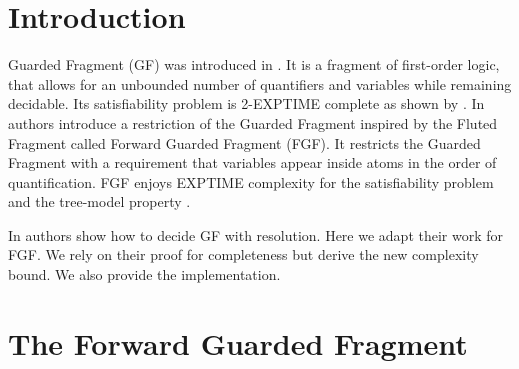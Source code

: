 \documentclass[english, shortabstract]{iithesis}
\author         {Karol Ochman-Milarski}
\theoremstyle{definition} \newtheorem{definition}{Definition}[chapter]
\theoremstyle{remark} \newtheorem{remark}[definition]{Observation}
\theoremstyle{plain} \newtheorem{theorem}[definition]{Theorem}
\theoremstyle{plain} \newtheorem{lemma}[definition]{Lemma}
\begin{document}

\chapter{Introduction}

Guarded Fragment (GF) was introduced in \cite{benthem}.
It is a fragment of first-order logic, that allows for an unbounded number of quantifiers and variables while remaining decidable.
Its satisfiability problem is 2-EXPTIME complete as shown by \cite{gradel}.
In \cite{bbe} authors introduce a restriction of the Guarded Fragment inspired by the Fluted Fragment \cite{fluted} called Forward Guarded Fragment (FGF).
It restricts the Guarded Fragment with a requirement that variables appear inside atoms in the order of quantification.
FGF enjoys EXPTIME complexity for the satisfiability problem and the tree-model property \cite{bbe}.
\par In \cite{nivelle} authors show how to decide GF with resolution. Here we adapt their work for FGF.
We rely on their proof for completeness but derive the new complexity bound. We also provide the implementation.

\chapter{The Forward Guarded Fragment}
\end{document}
